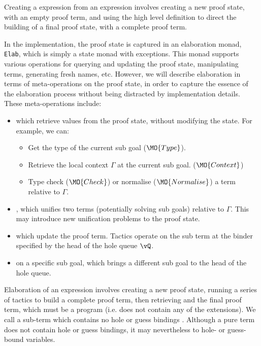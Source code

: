 Creating a \TT{} expression from an \Idris{} expression involves creating
a new proof state, with an empty proof term, and using the high level definition
to direct the building of a final proof state, with a complete proof term.

In the implementation, the proof state is captured in an elaboration monad,
\texttt{Elab}, which is simply a state monad with exceptions.  This monad
supports various operations for querying and updating the proof state,
manipulating terms, generating fresh names, etc. However, we will describe
\Idris{} elaboration in terms of meta-operations on the proof state, in order
to capture the essence of the elaboration process without being distracted by
implementation details. These meta-operations include: 

\begin{itemize}
\item {} which retrieve values from the proof state, without modifying
the state. For example, we can:
\begin{itemize}
\item Get the type of the current sub goal ($\MO{Type}$).
\item Retrieve the local context $\Gamma$ at the current sub goal.
($\MO{Context}$)
\item Type check ($\MO{Check}$) or normalise ($\MO{Normalise}$) a term relative
to $\Gamma$.
\end{itemize}
\item {}, which unifies two terms (potentially solving sub
goals) relative to $\Gamma$. This may introduce new unification problems
to the proof state.
\item {} which update the proof term. Tactics operate on the sub term
at the binder specified by the head of the hole queue $\vQ$.
\item {} on a specific sub goal, which brings a different sub goal to the
head of the hole queue.
\end{itemize}

Elaboration of an \Idris{} expression involves creating a new proof state,
running a series of tactics to build a complete proof term, then retrieving and
 the final proof term, which must be a \TT{} program (i.e.
does not contain any of the \TTdev{} extensions). We call a sub-term which
contains no hole or guess bindings . Although a pure term does not
contain hole or guess bindings, it may nevertheless  to hole- or
guess-bound variables.

